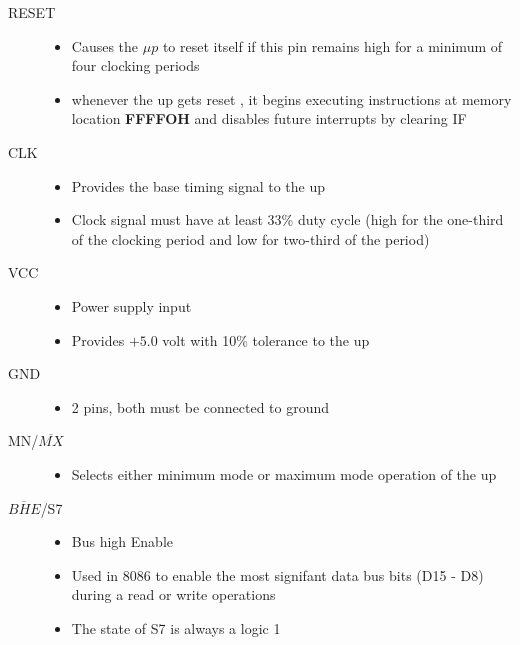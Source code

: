 \documentclass{article}
\begin{document}
\begin{description}
   \item[RESET]
   \begin{itemize}
       \item Causes the $\mu p$ to reset itself if this pin remains high for a minimum of four clocking periods
      \item whenever the up gets reset , it begins executing instructions at memory location \textbf{FFFFOH}
      and disables future interrupts by clearing IF
   \end{itemize}

   \item[CLK]
   \begin{itemize}
       \item  Provides the base timing signal to the up
       \item Clock signal must have at least 33\% duty cycle (high for the one-third
       of the clocking period and low for two-third of the period)

  \end{itemize}

  \item[VCC]
  \begin{itemize}
      \item Power supply input
      \item Provides $+5.0$ volt with 10\% tolerance to the up

  \end{itemize}

  \item[GND]
  \begin{itemize}
      \item 2 pins, both must be connected to ground

  \end{itemize}

  \item[MN/$\overline{MX}$]
  \begin{itemize}
      \item Selects either minimum mode or maximum mode operation of the up
  \end{itemize}


  \item[$\overline{BHE}$/S7]
  \begin{itemize}
      \item Bus high Enable
      \item Used in 8086 to enable the most signifant data bus bits (D15 - D8) during a read or
      write operations
      \item The state of S7 is always a logic 1
  \end{itemize}


\end{description}
\end{document}

